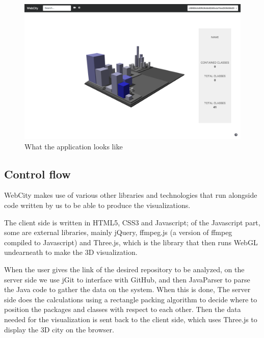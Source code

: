 \documentclass[]{usiinfbachelorproject}
\begin{document}
\begin{figure} [H]
\centering
\includegraphics[width=1\textwidth]{pictures/app.png}
\caption{What the application looks like}
\label{fig:app}
\end{figure}

\subsection{Control flow} \label{Control flow}
WebCity makes use of various other libraries and technologies that run alongside code written by us to be able to produce the visualizations.

The client side is written in HTML5, CSS3 and Javascript; of the Javascript part, some are external libraries, mainly jQuery, ffmpeg.js (a version of ffmpeg compiled to Javascript) and Three.js, which is the library that then runs WebGL undearneath to make the 3D visualization.

When the user gives the link of the desired repository to be analyzed, on the server side we use jGit to interface with GitHub, and then JavaParser to parse the Java code to gather the data on the system. When this is done, The server side does the calculations using a rectangle packing algorithm to decide where to position the packages and classes with respect to each other. Then the data needed for the visualization is sent back to the client side, which uses Three.js to display the 3D city on the browser.
\end{document}
